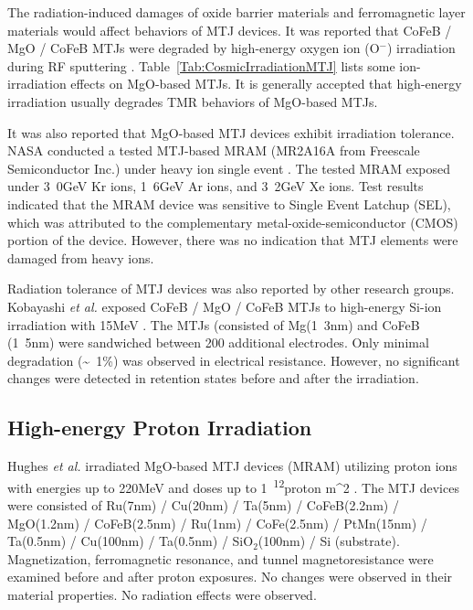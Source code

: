 \documentclass[molecules,review,submit,pdftex,moreauthors]{Definitions/mdpi}
\begin{document}
The radiation-induced damages of oxide barrier materials and ferromagnetic layer materials would affect behaviors of MTJ devices. It was reported that CoFeB / MgO / CoFeB MTJs were degraded by high-energy oxygen ion (O$^-$) irradiation during RF sputtering \cite{ono2011JJAP}.  Table~\ref{Tab:CosmicIrradiationMTJ} lists some ion-irradiation effects on MgO-based MTJs.  It is generally accepted that high-energy irradiation usually degrades TMR behaviors of MgO-based MTJs. 


It was also reported that MgO-based MTJ devices exhibit irradiation tolerance.  NASA conducted a tested MTJ-based MRAM (MR2A16A from Freescale Semiconductor Inc.) under heavy ion single event \cite{Elghefari2008Report}.  The tested MRAM exposed under \unit{3.0}{GeV} Kr ions, \unit{1.6}{GeV} Ar ions, and \unit{3.2}{GeV} Xe ions.  Test results indicated that the MRAM device was sensitive to Single Event Latchup (SEL), which was attributed to the complementary metal-oxide-semiconductor (CMOS) portion of the device.  However, there was no indication that MTJ elements were damaged from heavy ions. 


Radiation tolerance of MTJ devices was also reported by other research groups.  Kobayashi \textit{et al.} exposed CoFeB / MgO / CoFeB MTJs to high-energy Si-ion irradiation with \unit{15}{MeV} \cite{Kobayashi2014IEEE}.  The MTJs (consisted of Mg(\unit{1.3}{nm}) and CoFeB (\unit{1.5}{nm}) were sandwiched between \unit{200}{\micro\mete} additional electrodes.  Only minimal degradation (\unit{\sim 1}{\%}) was observed in electrical resistance.  However, no significant changes were detected in retention states before and after the irradiation.


\subsection{High-energy Proton Irradiation}


Hughes \textit{et al.} irradiated MgO-based MTJ devices (MRAM) utilizing proton ions with energies up to \unit{220}{MeV} and doses up to \unit{1 ^{12}}{proton \per m^2} \cite{Hughes2012IEEE}.  The MTJ devices were consisted of Ru(7nm) / Cu(20nm) / Ta(5nm) / CoFeB(2.2nm) / MgO(1.2nm) / CoFeB(2.5nm) / Ru(1nm) / CoFe(2.5nm) / PtMn(15nm) / Ta(0.5nm) / Cu(100nm) / Ta(0.5nm) / SiO$_2$(100nm) / Si (substrate). Magnetization, ferromagnetic resonance, and tunnel magnetoresistance were examined before and after proton exposures.  No changes were observed in their  material properties.  No radiation effects were observed.
\end{document}
